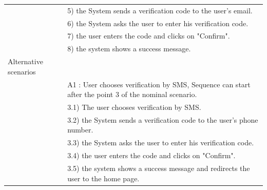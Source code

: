 \documentclass[]{uc2pfecaneva}
\begin{document}
\begin{table}[h]
\begin{tabularx}{\textwidth}{|l|X|}
		                      & 5) the System sends a verification code to the user's email.                                                                                                         \\
		                      & 6) the System asks the user to enter his verification code.                                                                                                          \\
		                      & 7) the user enters the code and clicks on "Confirm".                                                                                                                 \\
		                      & 8) the system shows a success message.                                                                                                                               \\ \hline
		Alternative scenarios &                                                                                                                                                                      \\
		                      & A1 : User chooses verification by SMS,  Sequence can start after the point 3 of the nominal scenario.                                                                \\
		                      & \hspace{4mm}3.1) The user chooses verification by SMS.                                                                                                               \\
		                      & \hspace{4mm}3.2) the System sends a verification code to the user's phone number.                                                                                    \\
		                      & \hspace{4mm}3.3) the System asks the user to enter his verification code.                                                                                            \\
		                      & \hspace{4mm}3.4) the user enters the code and clicks on "Confirm".                                                                                                   \\
		                      & \hspace{4mm}3.5) the system shows a success message and redirects the user to the home page.                                                                         \\ \hline

\end{tabularx}
\end{table}
\end{document}
